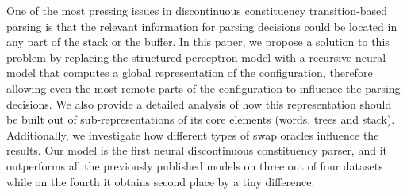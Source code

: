 One of the most pressing issues in discontinuous constituency transition-based parsing is that the relevant information for parsing decisions could be located in any part of the stack or the buffer. In this paper, we propose a solution to this problem by replacing the structured perceptron model with a recursive neural model that computes a global representation of the configuration, therefore allowing even the most remote parts of the configuration to influence the parsing decisions. We also provide a detailed analysis of how this representation should be built out of sub-representations of its core elements (words, trees and stack). Additionally, we investigate how different types of swap oracles influence the results.  Our model is the first neural discontinuous constituency parser, and it outperforms all the previously published models on three out of four datasets while on the fourth it obtains second place by a tiny difference.
